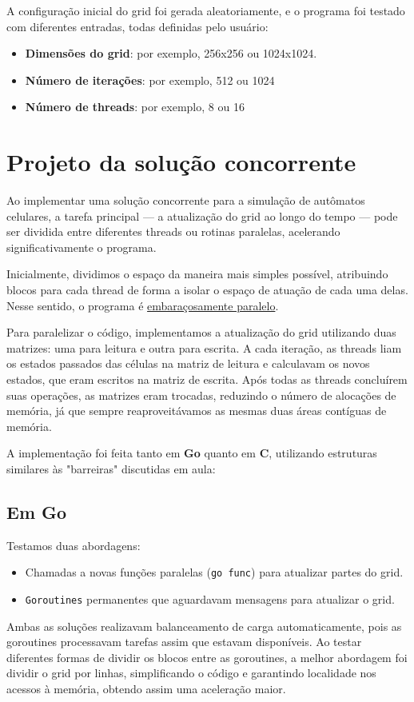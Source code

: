 \documentclass[14]{article}
\begin{document}
A configuração inicial do grid foi gerada aleatoriamente, e o programa foi testado com diferentes entradas, todas definidas pelo usuário:  
\begin{itemize}
    \item \textbf{Dimensões do grid}: por exemplo, 256x256 ou 1024x1024.  
    \item \textbf{Número de iterações}: por exemplo, 512 ou 1024
    \item \textbf{Número de threads}: por exemplo, 8 ou 16
\end{itemize}

\section{Projeto da solução concorrente}

Ao implementar uma solução concorrente para a simulação de autômatos celulares, a tarefa principal — a atualização do grid ao longo do tempo — pode ser dividida entre diferentes threads ou rotinas paralelas, acelerando significativamente o programa.  

Inicialmente, dividimos o espaço da maneira mais simples possível, atribuindo blocos para cada thread de forma a isolar o espaço de atuação de cada uma delas. Nesse sentido, o programa é \href{https://en.wikipedia.org/wiki/Embarrassingly_parallel}{embaraçosamente paralelo}.  

Para paralelizar o código, implementamos a atualização do grid utilizando duas matrizes: uma para leitura e outra para escrita. A cada iteração, as threads liam os estados passados das células na matriz de leitura e calculavam os novos estados, que eram escritos na matriz de escrita. Após todas as threads concluírem suas operações, as matrizes eram trocadas, reduzindo o número de alocações de memória, já que sempre reaproveitávamos as mesmas duas áreas contíguas de memória.  

A implementação foi feita tanto em \textbf{Go} quanto em \textbf{C}, utilizando estruturas similares às "barreiras" discutidas em aula:  
\subsection{Em Go}
    Testamos duas abordagens:  
    \begin{itemize}  
        \item Chamadas a novas funções paralelas (\texttt{go func}) para atualizar partes do grid.  
        \item \texttt{Goroutines} permanentes que aguardavam mensagens para atualizar o grid.  
    \end{itemize}  
    Ambas as soluções realizavam balanceamento de carga automaticamente, pois as goroutines processavam tarefas assim que estavam disponíveis. Ao testar diferentes formas de dividir os blocos entre as goroutines, a melhor abordagem foi dividir o grid por linhas, simplificando o código e garantindo localidade nos acessos à memória, obtendo assim uma aceleração maior.  
\end{document}
